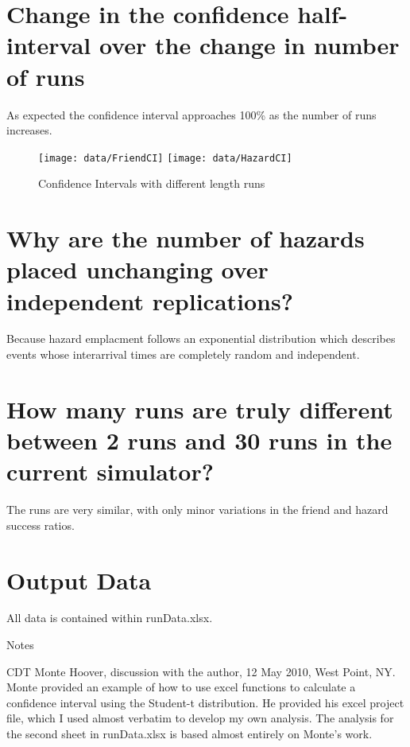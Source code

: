\documentclass[12pt,letterpaper,titlepage]{article}
\begin{document}
\section{Change in the confidence half-interval over the change in number of runs}

As expected the confidence interval approaches 100\% as the number of
runs increases.

\begin{figure}\centering
  \texttt{[image: data/FriendCI]}
  \texttt{[image: data/HazardCI]}
  \caption{Confidence Intervals with different length runs}
\end{figure}

\section{Why are the number of hazards placed unchanging over independent replications?}

Because hazard emplacment follows an exponential distribution which describes events whose interarrival times are completely random and independent.

\section{How many runs are truly different between 2 runs and 30 runs in the current simulator?}

The runs are very similar, with only minor variations in the friend
and hazard success ratios.

\section{Output Data}

All data is contained within runData.xlsx.


\clearpage

\begin{center}
  Notes
\end{center}

CDT Monte Hoover, discussion with the author, 12 May 2010, West Point,
NY.  Monte provided an example of how to use excel functions to
calculate a confidence interval using the Student-t distribution.  He
provided his excel project file, which I used almost verbatim to
develop my own analysis.  The analysis for the second sheet in runData.xlsx is
based almost entirely on Monte's work.
\end{document}

